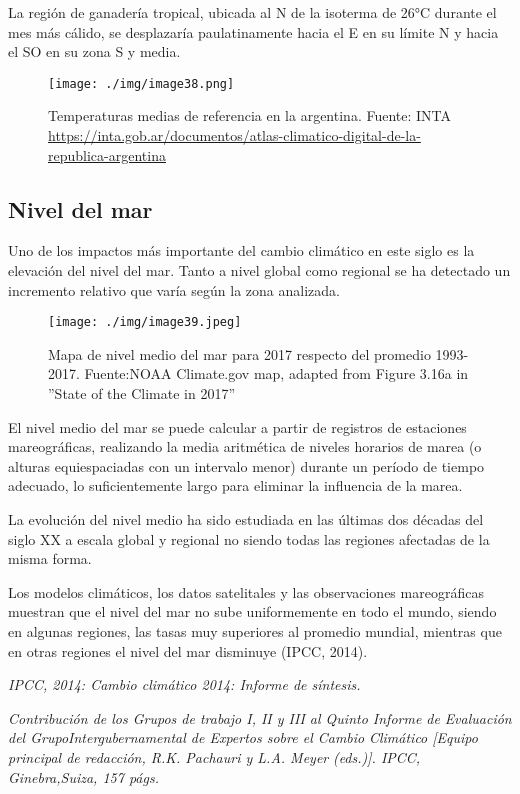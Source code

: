 \documentclass[
  a4paper,12pt]{extarticle}
\begin{document}
La región de ganadería tropical, ubicada al N de la isoterma de 26°C
durante el mes más cálido, se desplazaría paulatinamente hacia el E en
su límite N y hacia el SO en su zona S y media.

\begin{figure}
\centering
\texttt{[image: ./img/image38.png]}
\caption{Temperaturas medias de referencia en la argentina. Fuente: INTA
\url{https://inta.gob.ar/documentos/atlas-climatico-digital-de-la-republica-argentina}}
\end{figure}

\hypertarget{nivel-del-mar}{%
\subsection{Nivel del mar}\label{nivel-del-mar}}

Uno de los impactos más importante del cambio climático en este siglo es
la elevación del nivel del mar. Tanto a nivel global como regional se ha
detectado un incremento relativo que varía según la zona analizada.

\begin{figure}
\centering
\texttt{[image: ./img/image39.jpeg]}
\caption{Mapa de nivel medio del mar para 2017 respecto del promedio
1993-2017. Fuente:NOAA Climate.gov map, adapted from Figure 3.16a in
''State of the Climate in 2017''}
\end{figure}

\null\hfill\begin{minipage}{0.8\textwidth}

El nivel medio del mar se puede calcular a partir de registros de
estaciones mareográficas, realizando la media aritmética de niveles
horarios de marea (o alturas equiespaciadas con un intervalo menor)
durante un período de tiempo adecuado, lo suficientemente largo para
eliminar la influencia de la marea.

La evolución del nivel medio ha sido estudiada en las últimas dos
décadas del siglo XX a escala global y regional no siendo todas las
regiones afectadas de la misma forma.

Los modelos climáticos, los datos satelitales y las observaciones
mareográficas muestran que el nivel del mar no sube uniformemente en
todo el mundo, siendo en algunas regiones, las tasas muy superiores al
promedio mundial, mientras que en otras regiones el nivel del mar
disminuye (IPCC, 2014).

\emph{IPCC, 2014: Cambio climático 2014: Informe de síntesis.}

\emph{Contribución de los Grupos de trabajo I, II y III al Quinto
Informe de} \emph{Evaluación del GrupoIntergubernamental de Expertos
sobre el Cambio} \emph{Climático {[}Equipo principal de redacción, R.K.
Pachauri y L.A. Meyer} \emph{(eds.){]}. IPCC, Ginebra,Suiza, 157 págs.}

\end{minipage}
\end{document}
